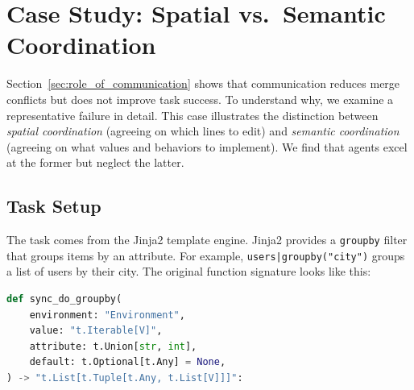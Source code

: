 



\section{Case Study: Spatial vs.\ Semantic Coordination}\label{app:case_study}

Section~\ref{sec:role_of_communication} shows that communication reduces merge conflicts but does not improve task success. To understand why, we examine a representative failure in detail. This case illustrates the distinction between \emph{spatial coordination} (agreeing on which lines to edit) and \emph{semantic coordination} (agreeing on what values and behaviors to implement). We find that agents excel at the former but neglect the latter.

\subsection{Task Setup}

The task comes from the Jinja2 template engine. Jinja2 provides a \texttt{groupby} filter that groups items by an attribute. For example, \texttt{users|groupby("city")} groups a list of users by their city. The original function signature looks like this:

\begin{lstlisting}[language=Python,basicstyle=\small\ttfamily]
def sync_do_groupby(
    environment: "Environment",
    value: "t.Iterable[V]",
    attribute: t.Union[str, int],
    default: t.Optional[t.Any] = None,
) -> "t.List[t.Tuple[t.Any, t.List[V]]]":
\end{lstlisting}

